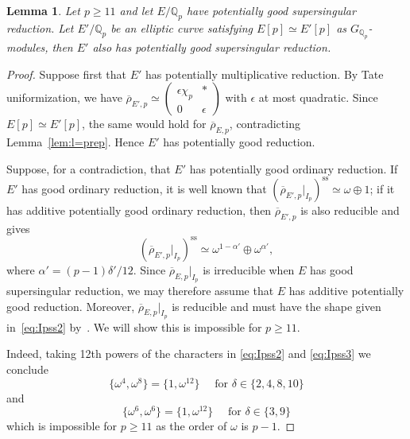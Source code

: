 \documentclass[12pt]{amsart}
\numberwithin{equation}{section}
\newtheorem{lemma}[equation]{Lemma}
\theoremstyle{definition}
\newcommand{\Q}{\mathbb{Q}}
\begin{document}
\begin{lemma}\label{lem:good-companion}
Let $p\geq11$ and let $E/\Q_p$ have potentially good supersingular reduction.  Let
$E'/\Q_p$ be an elliptic curve satisfying $E[p]\simeq E'[p]$ as $G_{\Q_p}$-modules, then $E'$
also has potentially good supersingular reduction.
\end{lemma}
\begin{proof}
Suppose first that $E'$ has potentially multiplicative reduction. By
Tate uniformization, we have $\overline{\rho}_{E',p}\simeq
 \left(\begin{smallmatrix}
  \epsilon\chi_p&*\\
  0&\epsilon
 \end{smallmatrix}\right)$ 
with $\epsilon$ at most quadratic. Since
$E[p]\simeq E'[p]$, the same would hold for
$\overline{\rho}_{E,p}$, contradicting
Lemma~\ref{lem:l=prep}. Hence $E'$ has potentially good
reduction.

Suppose, for a contradiction, that $E'$ has potentially
good ordinary reduction. 
If $E'$ has good ordinary reduction, it is well known that 
$\left(\overline{\rho}_{E',p}|_{I_p}\right)^{\mathrm{ss}}
 \simeq \omega \oplus 1$; if it has additive potentially good ordinary reduction, then
$\overline{\rho}_{E',p}$ is also reducible and \cite[Proposition 1]{Kraus1997} gives  
\begin{equation} \label{eq:Ipss3}
\left(\overline{\rho}_{E',p}|_{I_p}\right)^{\mathrm{ss}}
 \simeq \omega^{1-\alpha'}\oplus\omega^{\alpha'},
 \end{equation}
 where $\alpha'=(p-1)\delta'/12$.
Since $\overline{\rho}_{E,p}|_{I_p}$ is irreducible when $E$ has good supersingular reduction, we may therefore assume that $E$ has
additive potentially good reduction.
Moreover, $\overline{\rho}_{E,p}|_{I_p}$ is reducible and must have the shape given in~\eqref{eq:Ipss2} 
by~\cite[Proposition 2 and Lemme 2]{Kraus1997}. 
We will show this is impossible for $p\geq 11$.

Indeed, taking 12th powers of the characters in \eqref{eq:Ipss2} and \eqref{eq:Ipss3} we conclude 
\[
\{\omega^{4}, \omega^{8} \} = \{1,\omega^{12}\}  \quad \text{ for } \delta\in\{2,4,8,10\}
\]
and
\[
\{\omega^{6}, \omega^{6} \} = \{1,\omega^{12}\}  \quad \text{ for } \delta\in\{3,9\}
\]
which is impossible for $p \geq 11$ as the order of $\omega$ is $p-1$.\end{proof}
\end{document}
